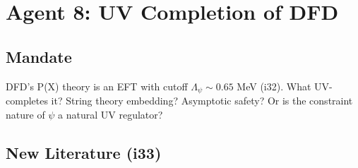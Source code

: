 \documentclass[11pt,a4paper]{article}
\begin{document}
\newpage

\section{Agent 8: UV Completion of DFD}
\label{sec:agent8}

\subsection{Mandate}

DFD's P(X) theory is an EFT with cutoff $\Lambda_\psi \sim 0.65$ MeV (i32). What UV-completes it? String theory embedding? Asymptotic safety? Or is the constraint nature of $\psi$ a natural UV regulator?

\subsection{New Literature (i33)}
\end{document}
